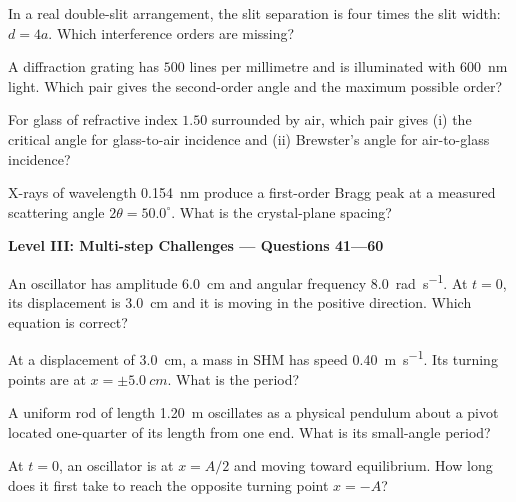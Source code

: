 \documentclass[10pt,a4paper]{physicsquiz}
\newcommand{\levelbanner}[2]{%
\item[]\begin{tcolorbox}[colback=QuizLightBlue,colframe=QuizBlue,boxrule=0.6pt,arc=1.5mm,left=5pt,right=5pt,top=4pt,bottom=4pt]
\centering\textbf{Level #1: #2}
\end{tcolorbox}}
\begin{document}
\begin{quizquestions}[2]
  \item In a real double-slit arrangement, the slit separation is four times the slit width: \(d=4a\). Which interference orders are missing?
  \item A diffraction grating has \(500\) lines per millimetre and is illuminated with \SI{600}{nm} light. Which pair gives the second-order angle and the maximum possible order?
  \item For glass of refractive index \(1.50\) surrounded by air, which pair gives (i) the critical angle for glass-to-air incidence and (ii) Brewster's angle for air-to-glass incidence?
  \item X-rays of wavelength \SI{0.154}{nm} produce a first-order Bragg peak at a measured scattering angle \(2\theta=50.0^\circ\). What is the crystal-plane spacing?
  \levelbanner{III}{Multi-step Challenges — Questions 41—60}
  \item An oscillator has amplitude \SI{6.0}{cm} and angular frequency \SI{8.0}{rad.s^{-1}}. At \(t=0\), its displacement is \SI{3.0}{cm} and it is moving in the positive direction. Which equation is correct?
  \item At a displacement of \SI{3.0}{cm}, a mass in SHM has speed \SI{0.40}{m.s^{-1}}. Its turning points are at \(x=\pm\SI{5.0}{cm}\). What is the period?
  \item A uniform rod of length \SI{1.20}{m} oscillates as a physical pendulum about a pivot located one-quarter of its length from one end. What is its small-angle period?
  \item At \(t=0\), an oscillator is at \(x=A/2\) and moving toward equilibrium. How long does it first take to reach the opposite turning point \(x=-A\)?

\end{quizquestions}
\end{document}
